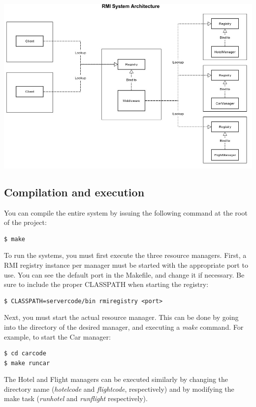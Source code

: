 \documentclass[11pt]{article}
\begin{document}
\begin{center}
  \includegraphics[scale=0.5]{rmi-architecture.jpg}
\end{center}



\subsection{Compilation and execution}

You can compile the entire system by issuing the following command at
the root of the project:


\begin{verbatim}
$ make
\end{verbatim}

To run the systems, you must first execute the three resource
managers.  First, a RMI registry instance per manager must be started
with the appropriate port to use.  You can see the default port in the
Makefile, and change it if necessary.  Be sure to include the proper
CLASSPATH when starting the registry:

\begin{verbatim}
$ CLASSPATH=servercode/bin rmiregistry <port>
\end{verbatim}


Next, you must start the actual resource manager. This can be done by
going into the directory of the desired manager, and executing a {\it
  make} command.  For example, to start the Car manager:

\begin{verbatim}
$ cd carcode
$ make runcar
\end{verbatim}

The Hotel and Flight managers can be executed similarly by changing
the directory name ({\it hotelcode} and {\it flightcode},
respectively) and by modifying the make task ({\it runhotel} and {\it
  runflight} respectively).
\end{document}
